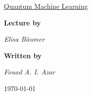 \begin{titlepage}
	\vspace{0.5cm}
	{\large \href{https://www.youtube.com/watch?v=xgA4Dx_7q34&list=PLOFEBzvs-VvqJwybFxkTiDzhf5E11p8BI&index=2}{Quantum Machine Learning} \par}
	{\normalsize\par}
	\vspace{2cm}
	{\textbf{Lecture by }\par}
	{\Large\itshape Elisa Bäumer\par}
	\vfill
	\textbf{Written by}\par 
	\textit{Fouad A. I. Azar }\\  \textsc{}

	\vfill

	{\large \today\par}
\end{titlepage}